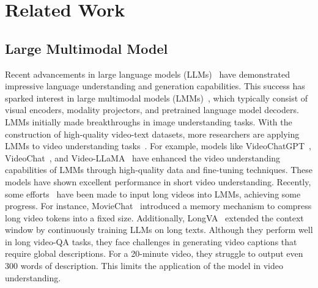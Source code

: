 \section{Related Work}
\label{sec:rela_work}
\subsection{Large Multimodal Model}
Recent advancements in large language models (LLMs)~\cite{touvron2023llama,jiang2023mistral,yang2024qwen2,Claude3,gpt4o,achiam2023gpt} have demonstrated impressive language understanding and generation capabilities. 
This success has sparked interest in large multimodal models (LMMs)~\cite{li2024llava,Dai2023InstructBLIPTG,Ye2023mPLUGOwlME,yao2024minicpm}, which typically consist of visual encoders, modality projectors, and pretrained language model decoders. 
LMMs initially made breakthroughs in image understanding tasks. 
With the construction of high-quality video-text datasets, more researchers are applying LMMs to video understanding tasks~\cite{zhang2024long,xue2024longvila,liu2024kangaroo,li2024llava,li2023llamavid,jin2023chat-univi,song2024moviechat,xu2024pllava,lin2023video}. 
For example, models like VideoChatGPT~\cite{0001RKK24}, VideoChat~\cite{li2023videochat}, and Video-LLaMA~\cite{cheng2024videollama} have enhanced the video understanding capabilities of LMMs through high-quality data and fine-tuning techniques.  
These models have shown excellent performance in short video understanding. 
Recently, some efforts~\cite{zhang2024long,wei2024visual,xue2024longvila,liu2024kangaroo} have been made to input long videos into LMMs, achieving some progress. 
For instance, MovieChat~\cite{song2024moviechat} introduced a memory mechanism to compress long video tokens into a fixed size. 
Additionally, LongVA~\cite{zhang2024long} extended the context window by continuously training LLMs on long texts. 
Although they perform well in long video-QA tasks, they face challenges in generating video captions that require global descriptions. 
For a 20-minute video, they struggle to output even 300 words of description. 
This limits the application of the model in video understanding. 

